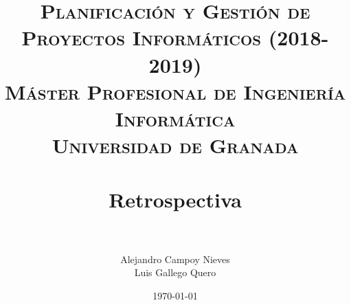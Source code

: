 

\title{	
	\normalfont \normalsize 
	\textsc{\textbf{Planificación y Gestión de Proyectos Informáticos (2018-2019)} \\ Máster Profesional de Ingeniería Informática \\ Universidad de Granada} \\ [25pt] %
	\horrule{0.5pt} \\[0.4cm] %
	\huge Retrospectiva \\ %
	\horrule{2pt} \\[0.5cm] %
}

\author{Alejandro Campoy Nieves \\ Luis Gallego Quero} %
\date{\normalsize\today} %

\usepackage[spanish, es-tabla]{babel}
\usepackage{hyperref} %
\hypersetup{
	colorlinks=true,
	linkcolor=blue,
	filecolor=magenta,      
	urlcolor=blue,
}
\usepackage{graphicx}
\usepackage{amssymb, amsmath, amsbsy}
\usepackage{mathptmx}	
\usepackage{float}
\usepackage{booktabs}					%
\usepackage{eurosym}

\usepackage[table]{xcolor}
\usepackage{color}
\usepackage{colortbl}
\usepackage{multicol}
\usepackage{multirow}
\usepackage{booktabs}
\usepackage{tabularx}
\usepackage{array}
\usepackage{caption}
\usepackage{subcaption}




	\maketitle %
	
	\newpage %
	
	
	
